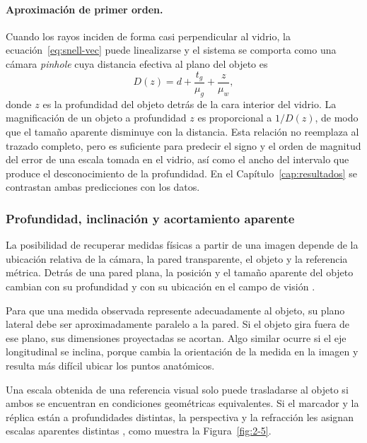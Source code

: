\paragraph{Aproximación de primer orden.} Cuando los rayos inciden de forma casi perpendicular al vidrio, la ecuación~\eqref{eq:snell-vec} puede linealizarse y el sistema se comporta como una cámara \emph{pinhole} cuya distancia efectiva al plano del objeto es \parencite{Treibitz2012,Agrawal2012}
\begin{equation}
D(z) = d + \frac{t_g}{\mu_g} + \frac{z}{\mu_w},
\label{eq:Dz}
\end{equation}
donde $z$ es la profundidad del objeto detrás de la cara interior del vidrio. La magnificación de un objeto a profundidad $z$ es proporcional a $1/D(z)$, de modo que el tamaño aparente disminuye con la distancia. Esta relación no reemplaza al trazado completo, pero es suficiente para predecir el signo y el orden de magnitud del error de una escala tomada en el vidrio, así como el ancho del intervalo que produce el desconocimiento de la profundidad. En el Capítulo~\ref{cap:resultados} se contrastan ambas predicciones con los datos.

\subsubsection{Profundidad, inclinación y acortamiento aparente}

La posibilidad de recuperar medidas físicas a partir de una imagen depende de la ubicación relativa de la cámara, la pared transparente, el objeto y la referencia métrica. Detrás de una pared plana, la posición y el tamaño aparente del objeto cambian con su profundidad y con su ubicación en el campo de visión \parencite{Hartley2004,Treibitz2012}.

Para que una medida observada represente adecuadamente al objeto, su plano lateral debe ser aproximadamente paralelo a la pared. Si el objeto gira fuera de ese plano, sus dimensiones proyectadas se acortan. Algo similar ocurre si el eje longitudinal se inclina, porque cambia la orientación de la medida en la imagen y resulta más difícil ubicar los puntos anatómicos.

Una escala obtenida de una referencia visual solo puede trasladarse al objeto si ambos se encuentran en condiciones geométricas equivalentes. Si el marcador y la réplica están a profundidades distintas, la perspectiva y la refracción les asignan escalas aparentes distintas \parencite{Monkman2019}, como muestra la Figura~\ref{fig:2-5}.

